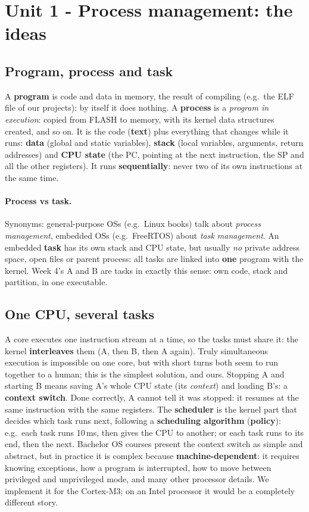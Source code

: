\section{Unit 1 - Process management: the ideas}

\subsection{Program, process and task}
A \textbf{program} is code and data in memory, the result of compiling (e.g.\ the ELF file of our projects): by itself it does nothing. A \textbf{process} is a \emph{program in execution}: copied from FLASH to memory, with its kernel data structures created, and so on. It is the code (\textbf{text}) plus everything that changes while it runs: \textbf{data} (global and static variables), \textbf{stack} (local variables, arguments, return addresses) and \textbf{CPU state} (the PC, pointing at the next instruction, the SP and all the other registers). It runs \textbf{sequentially}: never two of its own instructions at the same time.

\paragraph{Process vs task.} Synonyms: general-purpose OSs (e.g.\ Linux books) talk about \emph{process management}, embedded OSs (e.g.\ FreeRTOS) about \emph{task management}. An embedded \textbf{task} has its own stack and CPU state, but usually \emph{no} private address space, open files or parent process: all tasks are linked into \textbf{one} program with the kernel. Week 4's A and B are tasks in exactly this sense: own code, stack and partition, in one executable.

\subsection{One CPU, several tasks}
A core executes one instruction stream at a time, so the tasks must share it: the kernel \textbf{interleaves} them (A, then B, then A again). Truly simultaneous execution is impossible on one core, but with short turns both seem to run together to a human; this is the simplest solution, and ours. Stopping A and starting B means saving A's whole CPU state (its \emph{context}) and loading B's: a \textbf{context switch}. Done correctly, A cannot tell it was stopped: it resumes at the same instruction with the same registers. The \textbf{scheduler} is the kernel part that decides which task runs next, following a \textbf{scheduling algorithm} (\textbf{policy}): e.g.\ each task runs 10\,ms, then gives the CPU to another; or each task runs to its end, then the next. Bachelor OS courses present the context switch as simple and abstract, but in practice it is complex because \textbf{machine-dependent}: it requires knowing exceptions, how a program is interrupted, how to move between privileged and unprivileged mode, and many other processor details. We implement it for the Cortex-M3; on an Intel processor it would be a completely different story.

